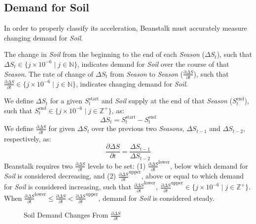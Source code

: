 \documentclass[tikz]{article}
\newcommand{\term}[1]{\textsl{#1}}
\begin{document}
\vspace*{-3.5mm} %
\subsection{Demand for Soil}
\vspace*{-3mm} %
In order to properly classify its acceleration, Beanstalk must accurately measure changing demand for \term{Soil}.

The change in \term{Soil} from the beginning to the end of each \term{Season} ($\Delta S_t$), such that $\Delta S_t \in \{j \times 10^{-6} \mid j \in \mathbb{N} \}$, indicates demand for \term{Soil} over the course of that \term{Season}. The rate of change of $\Delta S_t$ from \term{Season} to \term{Season} ($\frac{\partial \Delta S}{\partial t}$), such that $\frac{\partial \Delta S}{\partial t} \in \{j \times 10^{-6} \mid j \in \mathbb{N} \}$, indicates changing demand for \term{Soil}. 

We define $\Delta S_t$ for a given $S_t^{\text{start}}$ and \term{Soil} supply at the end of that \term{Season} ($S_t^{\text{end}}$), such that $S_t^{\text{end}} \in \{j \times 10^{-6} \mid j \in \mathbb{Z}^{+} \}$, as:
$$\Delta S_t = S_t^{\text{start}} - S_t^{\text{end}}$$
We define $\frac{\partial \Delta S}{\partial t}$ for given $\Delta S_t$ over the previous two \term{Seasons}, $\Delta S_{t-1}$ and $\Delta S_{t-2}$, respectively, as:
$$\frac{\partial \Delta S}{\partial t} = \frac{\Delta S_{t-1}}{\Delta S_{t-2}}$$
Beanstalk requires two $\frac{\partial \Delta S}{\partial t}$ levels to be set: (1) $\frac{\partial \Delta S}{\partial t}^{\text{lower}}$, below which demand for \term{Soil} is considered decreasing, and (2) $\frac{\partial \Delta S}{\partial t}^{\text{upper}}$, above or equal to which demand for \term{Soil} is considered increasing, such that $\frac{\partial \Delta S}{\partial t}^{\text{lower}},\ \frac{\partial \Delta S}{\partial t}^{\text{upper}} \in \{j \times 10^{-6} \mid j \in \mathbb{Z}^{+} \}$. When $\frac{\partial \Delta S}{\partial t}^{\text{lower}} \leq \frac{\partial \Delta S}{\partial t} < \frac{\partial \Delta S}{\partial t}^{\text{upper}}$, demand for \term{Soil} is considered steady.

\vspace*{-3.5mm} %
\begin{figure}[h!]
    \centering
    
    \vspace*{-10.5mm}
    \caption{Soil Demand Changes From $\frac{\partial \Delta S}{\partial t}$}
    \label{Fig 8}
\end{figure}
\end{document}
